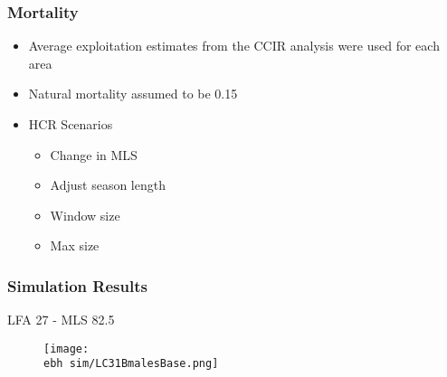\documentclass{beamer}
\newcommand{\ebh}{\string~/bio.data/bio.lobster/figures/LFA2733Framework2018/} %
\begin{document}
\begin{frame}
\frametitle{Mortality}
\begin{itemize}
\item Average exploitation estimates from the CCIR analysis were used for each area
\item Natural mortality assumed to be 0.15



\item HCR Scenarios
\begin{itemize}
\item Change in MLS
\item Adjust season length
\item Window size
\item Max size
\end{itemize}

\end{itemize}
\end{frame}



\begin{frame}
\frametitle{Simulation Results}
LFA 27 - MLS 82.5
\begin{figure}
        \begin{center}
            \texttt{[image: \\ebh sim/LC31BmalesBase.png]}
        \end{center}
    \end{figure}
\end{frame}
\end{document}
